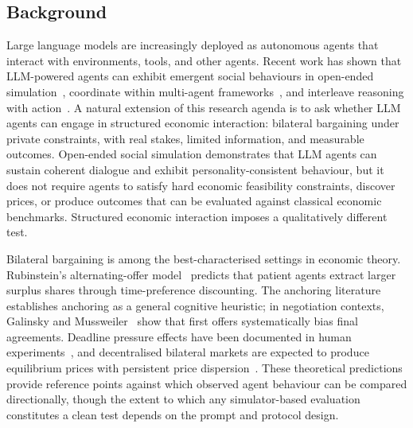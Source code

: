 
\label{sec:intro}

\subsection{Background}

Large language models are increasingly deployed as autonomous agents that
interact with environments, tools, and other agents.  Recent work has shown
that LLM-powered agents can exhibit emergent social behaviours in open-ended
simulation~\cite{park2023generative}, coordinate within multi-agent
frameworks~\cite{wu2023autogen}, and interleave reasoning with
action~\cite{yao2023react}.  A natural extension of this research agenda is
to ask whether LLM agents can engage in structured economic interaction:
bilateral bargaining under private constraints, with real stakes, limited
information, and measurable outcomes.  Open-ended social simulation
demonstrates that LLM agents can sustain coherent dialogue and exhibit
personality-consistent behaviour, but it does not require agents to satisfy
hard economic feasibility constraints, discover prices, or produce outcomes
that can be evaluated against classical economic benchmarks.  Structured
economic interaction imposes a qualitatively different test.

Bilateral bargaining is among the best-characterised settings in economic
theory.  Rubinstein's alternating-offer model~\cite{rubinstein1982} predicts
that patient agents extract larger surplus shares through time-preference
discounting.  The anchoring literature~\cite{tversky1974} establishes anchoring
as a general cognitive heuristic; in negotiation contexts, Galinsky and
Mussweiler~\cite{galinsky2001} show that first offers systematically bias
final agreements.  Deadline pressure effects have been documented in human
experiments~\cite{roth1988deadline}, and decentralised bilateral markets are
expected to produce equilibrium prices with persistent price
dispersion~\cite{rubinstein1985}.  These theoretical predictions provide
reference points against which observed agent behaviour can be compared
directionally, though the extent to which any simulator-based evaluation
constitutes a clean test depends on the prompt and protocol design.

